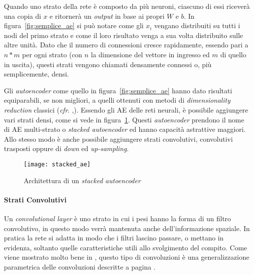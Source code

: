 Quando uno strato della rete è composto da più neuroni, ciascuno di essi riceverà una copia di $x$ e ritornerà un \textit{output} in base ai propri $W$ e $b$.
In figura~\ref{fig:semplice_ae} si può notare come gli $x_i$ vengano distribuiti su tutti i nodi del primo strato e come il loro risultato venga a sua volta distribuito sulle altre unità.
Dato che il numero di connessioni cresce rapidamente, essendo pari a $n*m$ per ogni strato (con $n$ la dimensione del vettore in ingresso ed $m$ di quello in uscita), questi strati vengono chiamati densamente connessi o, più semplicemente, densi.

Gli \textit{autoencoder} come quello in figura~\ref{fig:semplice_ae} hanno dato risultati equiparabili, se non migliori, a quelli ottenuti con metodi di \textit{dimensionality reduction} classici (\textit{cfr}. \cite{ng_sparse_ae},\cite{pca_vs_ae_1}).
Essendo gli AE delle reti neurali, è possibile aggiungere vari strati densi, come si vede in figura~\ref{fig:stacked_ae}.
Questi \textit{autoencoder} prendono il nome di AE multi-strato o \textit{stacked autoencoder} ed hanno capacità astrattive maggiori. %
Allo stesso modo è anche possibile aggiungere strati convolutivi, convolutivi trasposti oppure di \textit{down} ed \textit{up-sampling}.

\begin{figure}[ht] %
  \begin{center}
    \centering\texttt{[image: stacked\_ae]}
  \end{center}
  \caption{Architettura di un \textit{stacked autoencoder}}
  \label{fig:stacked_ae}
\end{figure}

\paragraph{Strati Convolutivi}
Un \textit{convolutional layer} è uno strato in cui i pesi hanno la forma di un filtro convolutivo, in questo modo verrà mantenuta anche dell'informazione spaziale.
In pratica la rete si adatta in modo che i filtri lascino passare, o mettano in evidenza, soltanto quelle caratteristiche utili allo svolgimento del compito.
Come viene mostrato molto bene in \cite{conv_arithm}, questo tipo di convoluzioni è una generalizzazione parametrica delle convoluzioni descritte a pagina \pageref{conv_para}.

